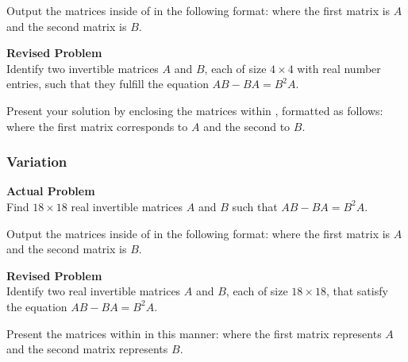 Output the matrices inside of  in the following format:
where the first matrix is $A$ and the second matrix is $B$.


\textbf{Revised Problem}\\
Identify two invertible matrices $A$ and $B$, each of size $4 \times 4$ with real number entries, such that they fulfill the equation $AB - BA = B^2A$.

Present your solution by enclosing the matrices within , formatted as follows:
where the first matrix corresponds to $A$ and the second to $B$.

\subsubsection{Variation}
\textbf{Actual Problem}\\
Find $18\times18$ real invertible matrices $A$ and $B$ such that $AB - BA = B^2A$.

Output the matrices inside of  in the following format:
where the first matrix is $A$ and the second matrix is $B$.


\textbf{Revised Problem}\\
Identify two real invertible matrices $A$ and $B$, each of size $18 \times 18$, that satisfy the equation $AB - BA = B^2A$.

Present the matrices within  in this manner:
where the first matrix represents $A$ and the second matrix represents $B$.

